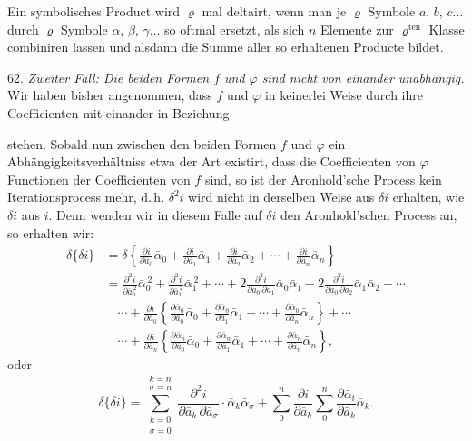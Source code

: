 \glqq Ein symbolisches Product wird $\varrho$ mal deltairt, wenn man je $\varrho$ Symbole $a$, $b$, $c\dots$ durch $\varrho$ Symbole $\alpha$, $\beta$, $\gamma\dots$ so oftmal ersetzt, als sich $n$ Elemente zur $\varrho^{\text{ten}}$ Klasse combiniren lassen und alsdann die Summe aller so erhaltenen Producte bildet.\grqq{}

62. \textit{Zweiter Fall: Die beiden Formen $f$ und $\varphi$ sind nicht von einander unabhängig.} Wir haben bisher angenommen, dass $f$ und $\varphi$ in keinerlei Weise durch ihre Coefficienten mit einander in Beziehung


stehen. Sobald nun zwischen den beiden Formen $f$ und $\varphi$ ein Abhängigkeitsverhältniss etwa der Art existirt, dass die Coefficienten von $\varphi$ Functionen der Coefficienten von $f$ sind, so ist der Aronhold'sche Process kein Iterationsprocess mehr, d.\,h. $\delta^2 i$ wird nicht in derselben Weise aus $\delta i$ erhalten, wie $\delta i$ aus $i$. Denn wenden wir in diesem Falle auf $\delta i$ den Aronhold'schen Process an, so erhalten wir:
\[
\begin{aligned}
\delta\{\delta i\} &= \delta\left\{ \frac{\partial i}{\partial \bar a_0}\bar\alpha_0 + \frac{\partial i}{\partial \bar a_1}\bar\alpha_1 + \frac{\partial i}{\partial \bar a_2}\bar\alpha_2 + \cdots + \frac{\partial i}{\partial \bar a_n}\bar\alpha_n \right\}\\
&= \frac{\partial^2 i}{\partial \bar a_0^{\,2}}\bar\alpha_0^{\,2} + \frac{\partial^2 i}{\partial \bar a_1^{\,2}}\bar\alpha_1^{\,2} + \cdots + 2\frac{\partial^2 i}{\partial \bar a_0\,\partial \bar a_1}\bar\alpha_0\bar\alpha_1 + 2\frac{\partial^2 i}{\partial \bar a_0\,\partial \bar a_2}\bar\alpha_1\bar\alpha_2 + \cdots %
\\
&\quad \cdots + \frac{\partial i}{\partial \bar a_0} \left\{ \frac{\partial \bar\alpha_0}{\partial \bar a_0}\bar\alpha_0 + \frac{\partial \bar\alpha_0}{\partial \bar a_1}\bar\alpha_1 + \cdots + \frac{\partial \bar\alpha_0}{\partial \bar a_n}\bar\alpha_n \right\} + \cdots\\
&\quad \cdots + \frac{\partial i}{\partial \bar a_n} \left\{ \frac{\partial \bar\alpha_n}{\partial \bar a_0}\bar\alpha_0 + \frac{\partial \bar\alpha_n}{\partial \bar a_1}\bar\alpha_1 + \cdots + \frac{\partial \bar\alpha_n}{\partial \bar a_n}\bar\alpha_n \right\},
\end{aligned}
\]
oder
\[
\delta\{\delta i\} = \sum_{\substack{k=0\\ \sigma=0}}^{\substack{k=n\\ \sigma=n}} \frac{\partial^2 i}{\partial \bar a_k\,\partial \bar a_\sigma}\cdot \bar\alpha_k\bar\alpha_\sigma + \sum_0^n \frac{\partial i}{\partial \bar a_k}\sum_0^n \frac{\partial \bar\alpha_i}{\partial \bar a_k}\bar\alpha_k.
\]

